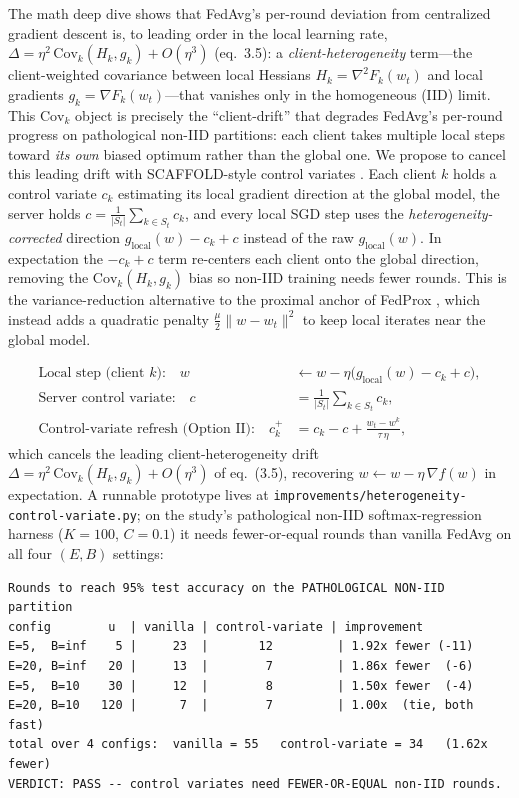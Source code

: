 \documentclass[11pt]{article}
\begin{document}
The math deep dive shows that FedAvg's per-round deviation from centralized gradient descent is, to leading order in the local learning rate, $\Delta=\eta^2\,\mathrm{Cov}_k(H_k,g_k)+O(\eta^3)$ (eq.~3.5): a \emph{client-heterogeneity} term---the client-weighted covariance between local Hessians $H_k=\nabla^2 F_k(w_t)$ and local gradients $g_k=\nabla F_k(w_t)$---that vanishes only in the homogeneous (IID) limit. This $\mathrm{Cov}_k$ object is precisely the ``client-drift'' that degrades FedAvg's per-round progress on pathological non-IID partitions: each client takes multiple local steps toward \emph{its own} biased optimum rather than the global one. We propose to cancel this leading drift with SCAFFOLD-style control variates \citep{karimireddy2020scaffold}. Each client $k$ holds a control variate $c_k$ estimating its local gradient direction at the global model, the server holds $c=\frac{1}{|S_t|}\sum_{k\in S_t}c_k$, and every local SGD step uses the \emph{heterogeneity-corrected} direction $g_{\mathrm{local}}(w)-c_k+c$ instead of the raw $g_{\mathrm{local}}(w)$. In expectation the $-c_k+c$ term re-centers each client onto the global direction, removing the $\mathrm{Cov}_k(H_k,g_k)$ bias so non-IID training needs fewer rounds. This is the variance-reduction alternative to the proximal anchor of FedProx \citep{li2020fedprox}, which instead adds a quadratic penalty $\tfrac{\mu}{2}\lVert w-w_t\rVert^2$ to keep local iterates near the global model.

\begin{align}
\text{Local step (client } k\text{):}\quad
  w &\leftarrow w-\eta\bigl(g_{\mathrm{local}}(w)-c_k+c\bigr),\\
\text{Server control variate:}\quad
  c &= \tfrac{1}{|S_t|}\textstyle\sum_{k\in S_t} c_k,\\
\text{Control-variate refresh (Option II):}\quad
  c_k^{+} &= c_k - c + \tfrac{w_t-w^k}{\tau\,\eta},
\end{align}
which cancels the leading client-heterogeneity drift $\Delta=\eta^2\,\mathrm{Cov}_k(H_k,g_k)+O(\eta^3)$ of eq.~(3.5), recovering $w\leftarrow w-\eta\,\nabla f(w)$ in expectation. A runnable prototype lives at \texttt{improvements/heterogeneity-control-variate.py}; on the study's pathological non-IID softmax-regression harness ($K{=}100$, $C{=}0.1$) it needs fewer-or-equal rounds than vanilla FedAvg on all four $(E,B)$ settings:

\begin{lstlisting}
Rounds to reach 95% test accuracy on the PATHOLOGICAL NON-IID partition
config        u  | vanilla | control-variate | improvement
E=5,  B=inf    5 |     23  |       12         | 1.92x fewer (-11)
E=20, B=inf   20 |     13  |        7         | 1.86x fewer  (-6)
E=5,  B=10    30 |     12  |        8         | 1.50x fewer  (-4)
E=20, B=10   120 |      7  |        7         | 1.00x  (tie, both fast)
total over 4 configs:  vanilla = 55   control-variate = 34   (1.62x fewer)
VERDICT: PASS -- control variates need FEWER-OR-EQUAL non-IID rounds.
\end{lstlisting}
\end{document}
